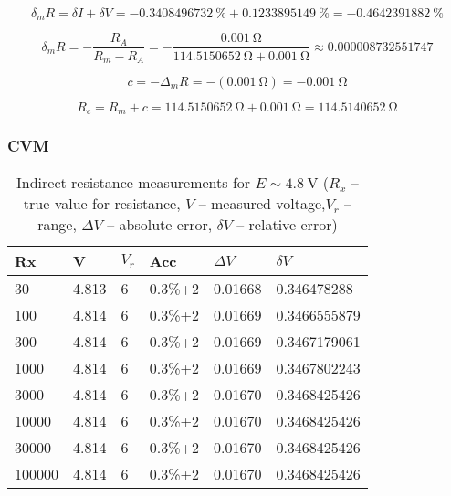 \begin{equation}
	\delta_m R = \delta I + \delta V = -\SI{0.3408496732}{\percent} + \SI{0.1233895149}{\percent} = -\SI{0.4642391882}{\percent}
	\label{eq:digital_indirect}
\end{equation}

\begin{equation}
	\delta_m R = -\frac{R_A}{R_m - R_A} = -\frac{\SI{0.001}{\ohm}}{\SI{114.5150652}{\ohm} + \SI{0.001}{\ohm}} \approx 0.000008732551747
	\label{eq:digital_indirect}
\end{equation}

\begin{equation}
	c = -\Delta_m R = -(\SI{0.001}{\ohm}) = -\SI{0.001}{\ohm}
	\label{eq:digital_indirect}
\end{equation}

\begin{equation}
	R_c = R_m + c = \SI{114.5150652}{\ohm} + \SI{0.001}{\ohm} = \SI{114.5140652}{\ohm}
	\label{eq:analog_V_c}
\end{equation}

\subsubsection*{CVM}

\begin{table}[!ht]
	\centering
	\begin{tabular}{|l|l|l|l|l|l|}
		\hline
		Rx & V & $V_r$ & Acc & $\Delta V$ & $\delta V$ \\ \hline
		30 & 4.813 & 6 & 0.3\%+2 & 0.01668 & 0.346478288 \\ \hline
		100 & 4.814 & 6 & 0.3\%+2 & 0.01669 & 0.3466555879 \\ \hline
		300 & 4.814 & 6 & 0.3\%+2 & 0.01669 & 0.3467179061 \\ \hline
		1000 & 4.814 & 6 & 0.3\%+2 & 0.01669 & 0.3467802243 \\ \hline
		3000 & 4.814 & 6 & 0.3\%+2 & 0.01670 & 0.3468425426 \\ \hline
		10000 & 4.814 & 6 & 0.3\%+2 & 0.01670 & 0.3468425426 \\ \hline
		30000 & 4.814 & 6 & 0.3\%+2 & 0.01670 & 0.3468425426 \\ \hline
		100000 & 4.814 & 6 & 0.3\%+2 & 0.01670 & 0.3468425426 \\ \hline
	\end{tabular}
	\caption{Indirect resistance measurements for $E \sim \SI{4.8}{\volt}$ ($R_x$ -- true value for resistance, $V$ -- measured voltage,$V_r$ -- range,  $\Delta V$ -- absolute error, $\delta V$ -- relative error)}
	\label{tab:analog_volt_1}
\end{table}

